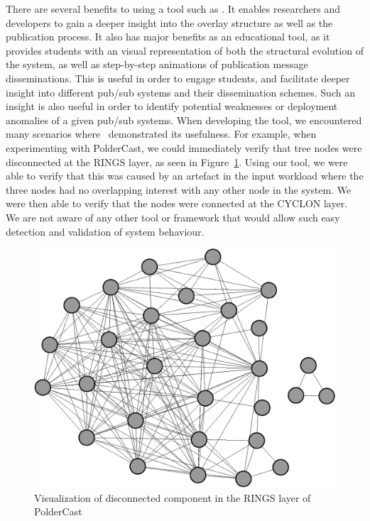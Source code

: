 There are several benefits to using a tool such as \demo. It enables
researchers and developers to gain a deeper insight into the overlay
structure as well as the publication process. It also has major benefits
as an educational tool, as it provides students with an visual
representation of both the structural evolution of the system, as well
as step-by-step animations of publication message disseminations. This
is useful in order to engage students, and facilitate deeper insight
into different pub/sub systems and their dissemination schemes. Such an
insight is also useful in order to identify potential weaknesses or
deployment anomalies of a given pub/sub systems. When developing the
tool, we encountered many scenarios where \demo~demonstrated its
usefulness. For example, when experimenting with PolderCast, we could
immediately verify that tree nodes were disconnected at the RINGS layer,
as seen in Figure~\ref{fig:pold_disc}.  Using our tool, we were able to
verify that this was caused by an artefact in the input workload where
the three nodes had no overlapping interest with any other node in the
system. We were then able to verify that the nodes were connected at the
CYCLON layer. We are not aware of any other tool or framework that would
allow such easy detection and validation of system behaviour.

\begin{figure}[h]
\includegraphics[width=\linewidth]{figures/disconnected-component-poldercast.pdf}
\caption{Visualization of disconnected component in the RINGS layer of PolderCast}
\label{fig:pold_disc}
\end{figure}

